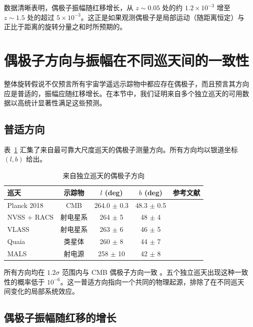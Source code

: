 \documentclass[11pt,a4paper]{article}
\begin{document}
	数据清晰表明，偶极子振幅随红移增长，从 \(z\sim0.05\) 处的约 \(1.2 \times 10^{-3}\) 增至 \(z\sim1.5\) 处的超过 \(5\times10^{-3}\)。这正是如果观测偶极子是局部运动（随距离恒定）与正比于距离的旋转分量之和时所预期的。
	
	\section{偶极子方向与振幅在不同巡天间的一致性}
	
	整体旋转假说不仅预言所有宇宙学遥远示踪物中都应存在偶极子，而且预言其方向应是普适的，振幅应随红移增长。在本节中，我们证明来自多个独立巡天的可用数据以高统计显著性满足这些预测。
	
	\subsection{普适方向}
	
	表~\ref{tab:dipole_directions} 汇集了来自最可靠大尺度巡天的偶极子测量方向。所有方向均以银道坐标 \((l,b)\) 给出。
	
	\begin{table}[htbp]
		\centering
		\caption{来自独立巡天的偶极子方向}
		\label{tab:dipole_directions}
		\begin{tabular}{lcccc}
			\toprule
			\textbf{巡天} & \textbf{示踪物} & \(l\) (deg) & \(b\) (deg) & \textbf{参考文献} \\
			\midrule
			Planck 2018 & CMB & 264.0 \(\pm\) 0.3 & 48.3 \(\pm\) 0.5 & \cite{Planck2018VII} \\
			NVSS + RACS & 射电星系 & 264 \(\pm\) 5 & 48 \(\pm\) 4 & \cite{Oayda2024} \\
			VLASS & 射电星系 & 263 \(\pm\) 6 & 46 \(\pm\) 5 & \cite{Wagenveld2025} \\
			Quaia & 类星体 & 260 \(\pm\) 8 & 44 \(\pm\) 7 & \cite{Secrest2025} \\
			MALS & 射电源 & 258 \(\pm\) 10 & 42 \(\pm\) 8 & \cite{Wagenveld2025} \\
			\bottomrule
		\end{tabular}
	\end{table}
	
	所有方向均在 \(1.2\sigma\) 范围内与 CMB 偶极子方向一致 \cite{Oayda2024}。五个独立巡天出现这种一致性的概率低于 \(10^{-6}\)。这一普适方向指向一个共同的物理起源，排除了在不同巡天间变化的局部系统效应。
	
	\subsection{偶极子振幅随红移的增长}
	
\end{document}

